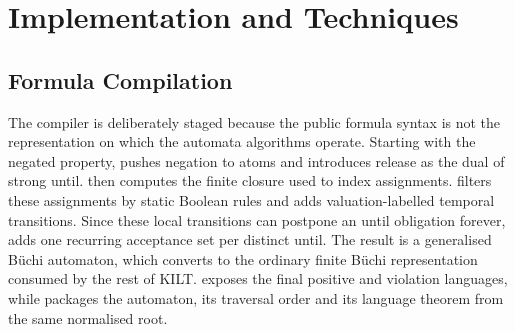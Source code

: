 \section{Implementation and Techniques}\label{sec:implementation}

\subsection{Formula Compilation}

The compiler is deliberately staged because the public formula syntax is not
the representation on which the automata algorithms operate.  Starting with
the negated property,  pushes negation to atoms and
introduces release as the dual of strong until.  
then computes the finite closure used to index assignments.
 filters these assignments by static Boolean rules and
adds valuation-labelled temporal transitions.  Since these local transitions
can postpone an until obligation forever, 
adds one recurring acceptance set per distinct until.  The result is a
generalised B\"uchi automaton, which  converts
to the ordinary finite B\"uchi representation consumed by the rest of KILT.
 exposes the final positive and violation languages,
while  packages the automaton, its traversal order and
its language theorem from the same normalised root.

